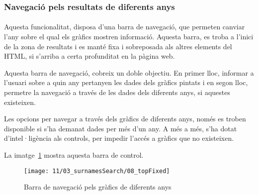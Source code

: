 \subsubsection{Navegació pels resultats de diferents anys}

\paragraph{}
Aquesta funcionalitat, disposa d’una barra de navegació, que permeten canviar l’any sobre el qual els gràfics mostren informació. Aquesta barra, es troba a l’inici de la zona de resultats i es manté fixa i sobreposada als altres elements del HTML, si s’arriba a certa profunditat en la pàgina web.

Aquesta barra de navegació, cobreix un doble objectiu. En primer lloc, informar a l'usuari sobre a quin any pertanyen les dades dels gràfics pintats i en segon lloc, permetre la navegació a través de les dades dels diferents anys, si aquestes existeixen.

Les opcions per navegar a través dels gràfics de diferents anys, només es troben disponible si s'ha demanat dades per més d'un any. A més a més, s'ha dotat  d'intel·ligència als controls, per impedir l'accés a gràfics que no existeixen.

La imatge~\ref{fig:topFixed} mostra aquesta barra de control.

\begin{figure}[h]
    \texttt{[image: 11/03\_surnamesSearch/08\_topFixed]}
    \centering
    \caption{Barra de navegació pels gràfics de diferents anys}\label{fig:topFixed}
\end{figure}
